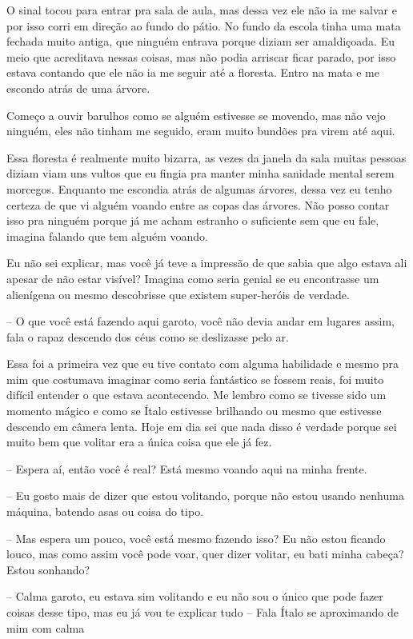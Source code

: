 O sinal tocou para entrar pra sala de aula, mas dessa vez ele não ia me salvar e por isso corri em direção ao fundo do pátio. No fundo da escola tinha uma mata fechada muito antiga, que ninguém entrava porque diziam ser amaldiçoada. Eu meio que acreditava nessas coisas, mas não podia arriscar ficar parado, por isso estava contando que ele não ia me seguir até a floresta. Entro na mata e me escondo atrás de uma árvore. 

Começo a ouvir barulhos como se alguém estivesse se movendo, mas não vejo ninguém, eles não tinham me seguido, eram muito bundões pra virem até aqui.

Essa floresta é realmente muito bizarra, as vezes da janela da sala muitas pessoas diziam viam uns vultos que eu fingia pra manter minha sanidade mental serem morcegos. Enquanto me escondia atrás de algumas árvores, dessa vez eu tenho certeza de que vi alguém voando entre as copas das árvores. Não posso contar isso pra ninguém porque já me acham estranho o suficiente sem que eu fale, imagina falando que tem alguém voando.

Eu não sei explicar, mas você já teve a impressão de que sabia que algo estava ali apesar de não estar visível? Imagina como seria genial se eu encontrasse um alienígena ou mesmo descobrisse que existem super-heróis de verdade.

-- O que você está fazendo aqui garoto, você não devia andar em lugares assim, fala o rapaz descendo dos céus como se deslizasse pelo ar.

Essa foi a primeira vez que eu tive contato com alguma habilidade e mesmo pra mim que costumava imaginar como seria fantástico se fossem reais, foi muito difícil entender o que estava acontecendo. Me lembro como se tivesse sido um momento mágico e como se Ítalo estivesse brilhando ou mesmo que estivesse descendo em câmera lenta. Hoje em dia sei que nada disso é verdade porque sei muito bem que volitar era a única coisa que ele já fez.

-- Espera aí, então você é real? Está mesmo voando aqui na minha frente.

-- Eu gosto mais de dizer que estou volitando, porque não estou usando nenhuma máquina, batendo asas ou coisa do tipo.

-- Mas espera um pouco, você está mesmo fazendo isso? Eu não estou ficando louco, mas como assim você pode voar, quer dizer volitar, eu bati minha cabeça? Estou sonhando?

-- Calma garoto, eu estava sim volitando e eu não sou o único que pode fazer coisas desse tipo, mas eu já vou te explicar tudo -- Fala Ítalo se aproximando de mim com calma 

